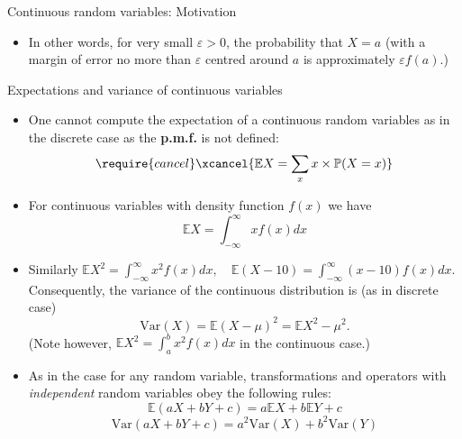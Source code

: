 \documentclass[ignorenonframetext,]{beamer}
\providecommand{\tightlist}{%
  \setlength{\itemsep}{0pt}\setlength{\parskip}{0pt}}
\begin{document}
\begin{frame}{Continuous random variables: Motivation}
\begin{itemize}
  \begin{itemize}
  \tightlist
  \item
    In other words, for very small \(\varepsilon>0\), the probability
    that \(X=a\) (with a margin of error no more than \(\varepsilon\)
    centred around \(a\) is approximately \(\varepsilon f(a)\).)
  \end{itemize}
\end{itemize}

\end{frame}

\begin{frame}{Expectations and variance of continuous variables}

\begin{itemize}
\item
  One cannot compute the expectation of a continuous random variables as
  in the discrete case as the \textbf{p.m.f.} is not defined: \[
  \require{cancel} 
  \xcancel{\mathbb{E}X=\sum_x x\times \mathbb{P}(X=x)}
  \]
\item
  For continuous variables with density function \(f(x)\) we have
  \[ \mathbb{E}X=\int^{\infty}_{-\infty}xf(x)dx\]
\item
  Similarly
  \(\mathbb{E}X^2=\int^{\infty}_{-\infty}x^2f(x)dx,\quad \mathbb{E}(X-10)=\int^{\infty}_{-\infty}(x-10)f(x)dx\).
  Consequently, the variance of the continuous distribution is (as in
  discrete case)
  \[\text{Var}(X)=\mathbb{E}(X-\mu)^2=\mathbb{E}X^2-\mu^2. \] (Note
  however, \(\mathbb{E}X^2=\int^b_a x^2 f(x)dx\) in the continuous
  case.)
\item
  As in the case for any random variable, transformations and operators
  with \emph{independent} random variables obey the following rules:
  \[\mathbb{E}(aX+bY+c)=a\mathbb{E}X+b\mathbb{E}Y+c\]
  \[\text{Var}(aX+bY+c)=a^2\text{Var}(X)+b^2\text{Var}(Y)\]
\end{itemize}

\end{frame}
\end{document}
